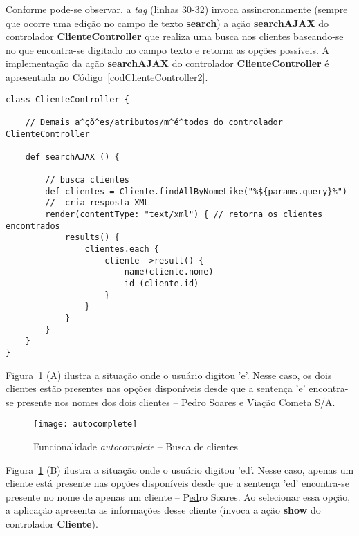 \newpage

\noindent  Conforme pode-se  observar, a  {\it tag}  {\bf <richui:autoComplete>}
(linhas 30-32) invoca assincronamente (sempre  que ocorre uma edição no campo de
texto   {\bf   search})   a   ação   {\bf  searchAJAX}   do   controlador   {\bf
  ClienteController}  que realiza  uma  busca nos  clientes  baseando-se no  que
encontra-se  digitado  no  campo  texto   e  retorna  as  opções  possíveis.   A
implementação da ação {\bf  searchAJAX} do controlador {\bf ClienteController} é
apresentada no Código~\ref{codClienteController2}.  

\begin{lstlisting}[caption=Controlador          {\bf         ClienteController},
    frame=trBL,float=htbp, label=codClienteController2]
class ClienteController {

    // Demais a^çõ^es/atributos/m^é^todos do controlador ClienteController
    
    def searchAJAX () {
        
        // busca clientes
        def clientes = Cliente.findAllByNomeLike("%${params.query}%")
        //  cria resposta XML
        render(contentType: "text/xml") { // retorna os clientes encontrados
            results() { 
                clientes.each { 
                    cliente ->result() {
                        name(cliente.nome)
                        id (cliente.id)
                    }
                }
            }
        }
    }
}
\end{lstlisting}

\noindent  Figura~\ref{autocompleteFig} (A)  ilustra a  situação onde  o usuário
digitou 'e'. Nesse caso, os dois clientes estão presentes nas opções disponíveis
desde que  a sentença 'e'  encontra-se presente nos  nomes dos dois  clientes --
P\underline{e}dro Soares e Viação Com\underline{e}ta S/A. 

\vspace{0.2cm}

\begin{figure}[htbp]
\center
\texttt{[image: autocomplete]}
\caption{Funcionalidade {\it autocomplete} -- Busca de clientes}
\label{autocompleteFig}
\end{figure}

\vspace{0.2cm}

\noindent  Figura~\ref{autocompleteFig} (B)  ilustra a  situação onde  o usuário
digitou 'ed'. Nesse caso, apenas um cliente está presente nas opções disponíveis
desde que a  sentença 'ed' encontra-se presente no nome de  apenas um cliente --
P\underline{ed}ro  Soares. Ao selecionar  essa opção,  a aplicação  apresenta as
informações  desse  cliente  (invoca  a  ação {\bf  show}  do  controlador  {\bf
  Cliente}).  

